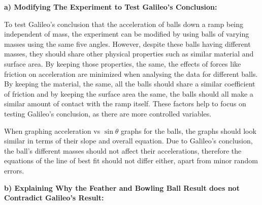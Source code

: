 \documentclass[12pt,letterpaper]{article}
\newcommand\tab[1][1cm]{\hspace*{#1}}
\begin{document}
\noindent
\tab \textbf{a) Modifying The Experiment to Test Galileo's Conclusion:}

\noindent
\begin{flushleft}
	\tab To test Galileo’s conclusion that the acceleration of balls down a ramp being \tab independent of mass, the experiment can be modified by using balls of varying masses \tab using the same five angles. However, despite these balls having different masses, they \tab should share other physical properties such as similar material and surface area. By \tab keeping those properties, the same, the effects of forces like friction on acceleration \tab are minimized when analysing the data for different balls. By keeping the \tab material, the same, all the balls should share a similar coefficient of friction and by \tab keeping the surface area the same, the balls should all make a similar amount of \tab contact with the ramp itself. These factors help to focus on testing Galileo’s \tab conclusion, as there are more controlled variables.

	\vspace{4mm}
	\tab When graphing acceleration vs $\sin\theta$ graphs for the balls, the graphs should look \tab similar in terms of their slope and overall equation. Due to Galileo’s conclusion, the \tab ball’s different masses should not affect their accelerations, therefore the equations of \tab the line of best fit should not differ either, apart from minor random errors.

\end{flushleft}


\noindent
\tab \textbf{b) Explaining Why the Feather and Bowling Ball Result does not Contradict \tab Galileo's Result:}
\end{document}
